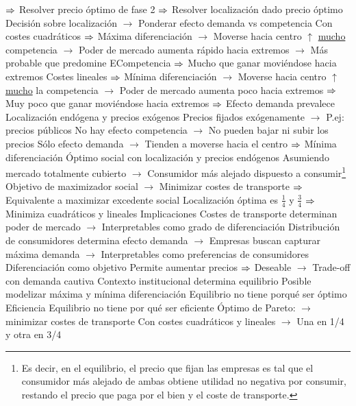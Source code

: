 \documentclass{nuevotema}
\begin{document}
\begin{esquemal}
				\4[] $\Rightarrow$ Resolver precio óptimo de fase 2
				\4[] $\Rightarrow$ Resolver localización dado precio óptimo
				\4[] Decisión sobre localización
				\4[] $\to$ Ponderar efecto demanda vs competencia
				\4[] Con costes cuadráticos $\Rightarrow$ Máxima diferenciación
				\4[] $\to$ Moverse hacia centro $\uparrow$ \underline{mucho} competencia
				\4[] $\to$ Poder de mercado aumenta rápido hacia extremos
				\4[] $\to$ Más probable que predomine ECompetencia
				\4[] $\Rightarrow$ Mucho que ganar moviéndose hacia extremos
				\4[] Costes lineales $\Rightarrow$ Mínima diferenciación
				\4[] $\to$ Moverse hacia centro $\uparrow$ \underline{mucho} la competencia
				\4[] $\to$ Poder de mercado aumenta poco hacia extremos
				\4[] $\Rightarrow$ Muy poco que ganar moviéndose hacia extremos
				\4[] $\Rightarrow$ Efecto demanda prevalece
				\4 Localización endógena y precios exógenos
				\4[] Precios fijados exógenamente
				\4[] $\to$ P.ej: precios públicos
				\4[] No hay efecto competencia
				\4[] $\to$ No pueden bajar ni subir los precios
				\4[] Sólo efecto demanda
				\4[] $\to$ Tienden a moverse hacia el centro
				\4[] $\Rightarrow$ Mínima diferenciación
				\4 Óptimo social con localización y precios endógenos
				\4[] Asumiendo mercado totalmente cubierto
				\4[] $\to$ Consumidor más alejado dispuesto a consumir\footnote{Es decir, en el equilibrio, el precio que fijan las empresas es tal que el consumidor más alejado de ambas obtiene utilidad no negativa por consumir, restando el precio que paga por el bien y el coste de transporte.}
				\4[] Objetivo de maximizador social
				\4[] $\to$ Minimizar costes de transporte
				\4[] $\Rightarrow$ Equivalente a maximizar excedente social
				\4[] Localización óptima es $\frac{1}{4}$ y $\frac{3}{4}$
				\4[] $\Rightarrow$ Minimiza cuadráticos y lineales
			\3 Implicaciones
				\4 Costes de transporte determinan poder de mercado
				\4[] $\to$ Interpretables como grado de diferenciación
				\4 Distribución de consumidores determina efecto demanda
				\4[] $\to$ Empresas buscan capturar máxima demanda
				\4[] $\to$ Interpretables como preferencias de consumidores
				\4 Diferenciación como objetivo
				\4[] Permite aumentar precios
				\4[] $\Rightarrow$ Deseable
				\4[] $\to$ Trade-off con demanda cautiva
				\4 Contexto institucional determina equilibrio
				\4[] Posible modelizar máxima y mínima diferenciación
				\4[] Equilibrio no tiene porqué ser óptimo
				\4 Eficiencia
				\4[] Equilibrio no tiene por qué ser eficiente
				\4[] Óptimo de Pareto:
				\4[] $\to$ minimizar costes de transporte
				\4[] Con costes cuadráticos y lineales
				\4[] $\to$ Una en 1/4 y otra en 3/4

\end{esquemal}
\end{document}
